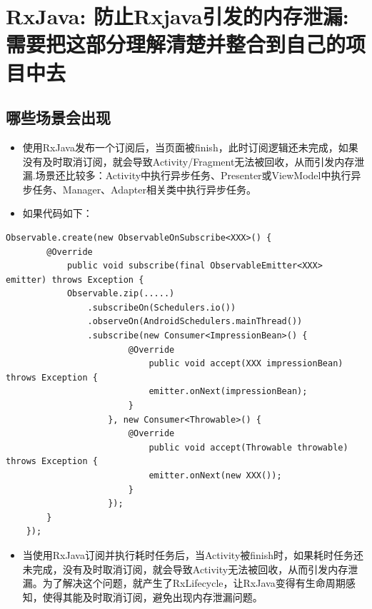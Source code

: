 \documentclass[9pt, b5paper]{article}
\begin{document}
\section{RxJava: 防止Rxjava引发的内存泄漏: 需要把这部分理解清楚并整合到自己的项目中去}
\label{sec-19}
\subsection{哪些场景会出现}
\label{sec-19-1}
\begin{itemize}
\item 使用RxJava发布一个订阅后，当页面被finish，此时订阅逻辑还未完成，如果没有及时取消订阅，就会导致Activity/Fragment无法被回收，从而引发内存泄漏.场景还比较多：Activity中执行异步任务、Presenter或ViewModel中执行异步任务、Manager、Adapter相关类中执行异步任务。
\item 如果代码如下：
\end{itemize}
\begin{verbatim}
Observable.create(new ObservableOnSubscribe<XXX>() {
        @Override
            public void subscribe(final ObservableEmitter<XXX> emitter) throws Exception {
            Observable.zip(.....)
                .subscribeOn(Schedulers.io())
                .observeOn(AndroidSchedulers.mainThread())
                .subscribe(new Consumer<ImpressionBean>() {
                        @Override
                            public void accept(XXX impressionBean) throws Exception {
                            emitter.onNext(impressionBean);
                        }
                    }, new Consumer<Throwable>() {
                        @Override
                            public void accept(Throwable throwable) throws Exception {
                            emitter.onNext(new XXX());
                        }
                    });
        }
    });
\end{verbatim}
\begin{itemize}
\item 当使用RxJava订阅并执行耗时任务后，当Activity被finish时，如果耗时任务还未完成，没有及时取消订阅，就会导致Activity无法被回收，从而引发内存泄漏。为了解决这个问题，就产生了RxLifecycle，让RxJava变得有生命周期感知，使得其能及时取消订阅，避免出现内存泄漏问题。
\end{itemize}
\end{document}
